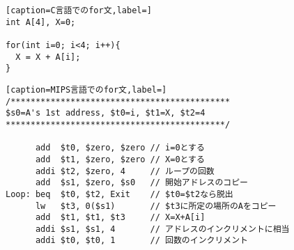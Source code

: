 \documentclass[a4paper, xelatex, ja=standard]{bxjsarticle}
\begin{document}
\begin{figure}[h]
\centering
\begin{minipage}[t]{0.3\linewidth}
\begin{lstlisting}[caption=C言語でのfor文,label=]
int A[4], X=0;

for(int i=0; i<4; i++){
  X = X + A[i];
}
\end{lstlisting}
\end{minipage}
\hspace{15pt}
\begin{minipage}[t]{0.5\linewidth}
\begin{lstlisting}[caption=MIPS言語でのfor文,label=]
/********************************************
$s0=A's 1st address, $t0=i, $t1=X, $t2=4
********************************************/

      add  $t0, $zero, $zero // i=0とする
      add  $t1, $zero, $zero // X=0とする
      addi $t2, $zero, 4     // ループの回数
      add  $s1, $zero, $s0   // 開始アドレスのコピー
Loop: beq  $t0, $t2, Exit    // $t0=$t2なら脱出
      lw   $t3, 0($s1)       // $t3に所定の場所のAをコピー
      add  $t1, $t1, $t3     // X=X+A[i] 
      addi $s1, $s1, 4       // アドレスのインクリメントに相当
      addi $t0, $t0, 1       // 回数のインクリメント
\end{lstlisting}
\end{minipage}
\label{}
\end{figure}
\end{document}
